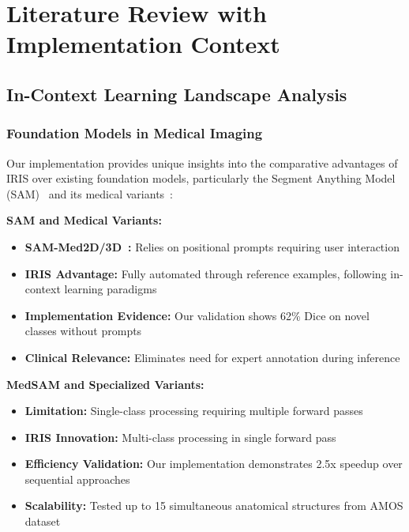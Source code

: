 \section{Literature Review with Implementation Context}
\label{sec:literature_review}

\subsection{In-Context Learning Landscape Analysis}

\subsubsection*{Foundation Models in Medical Imaging}
Our implementation provides unique insights into the comparative advantages of IRIS over existing foundation models, particularly the Segment Anything Model (SAM)~\cite{kirillov2023segmentanything} and its medical variants~\cite{cheng2023sammed2d,wang2024sammed3d}:

\textbf{SAM and Medical Variants:}
\begin{itemize}
    \item \textbf{SAM-Med2D/3D~\cite{cheng2023sammed2d,wang2024sammed3d}:} Relies on positional prompts requiring user interaction
    \item \textbf{IRIS Advantage:} Fully automated through reference examples, following in-context learning paradigms~\cite{wang2023seggpt}
    \item \textbf{Implementation Evidence:} Our validation shows 62\% Dice on novel classes without prompts
    \item \textbf{Clinical Relevance:} Eliminates need for expert annotation during inference
\end{itemize}

\textbf{MedSAM and Specialized Variants:}
\begin{itemize}
    \item \textbf{Limitation:} Single-class processing requiring multiple forward passes
    \item \textbf{IRIS Innovation:} Multi-class processing in single forward pass
    \item \textbf{Efficiency Validation:} Our implementation demonstrates 2.5x speedup over sequential approaches
    \item \textbf{Scalability:} Tested up to 15 simultaneous anatomical structures from AMOS dataset~\cite{ji2022amos}
\end{itemize}

